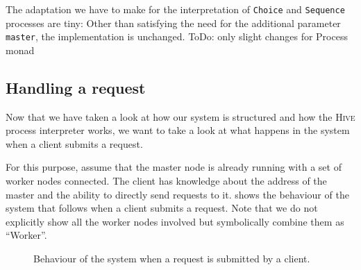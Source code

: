 The adaptation we have to make for the interpretation of \texttt{Choice} and \texttt{Sequence} processes are tiny: Other than satisfying the need for the additional parameter \texttt{master}, the implementation is unchanged. ToDo: only slight changes for Process monad

\subsection{Handling a request}
Now that we have taken a look at how our system is structured and how the \textsc{Hive} process interpreter works, we want to take a look at what happens in the system when a client submits a request.

For this purpose, assume that the master node is already running with a set of worker nodes connected. The client has knowledge about the address of the master and the ability to directly send requests to it.  shows the behaviour of the system that follows when a client submits a request. Note that we do not explicitly show all the worker nodes involved but symbolically combine them as \enquote{Worker}.

\begin{figure}[h!]
  \centering
  
  \caption{Behaviour of the system when a request is submitted by a client.}
  \label{fig:request_handling}
\end{figure}

